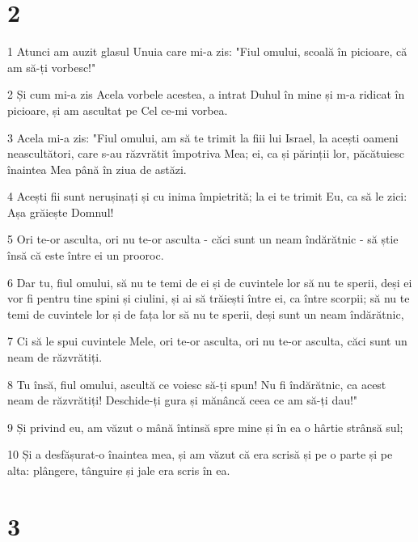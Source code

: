 \chapter{2}

\par 1 Atunci am auzit glasul Unuia care mi-a zis: "Fiul omului, scoală în picioare, că am să-ți vorbesc!"
\par 2 Și cum mi-a zis Acela vorbele acestea, a intrat Duhul în mine și m-a ridicat în picioare, și am ascultat pe Cel ce-mi vorbea.
\par 3 Acela mi-a zis: "Fiul omului, am să te trimit la fiii lui Israel, la acești oameni neascultători, care s-au răzvrătit împotriva Mea; ei, ca și părinții lor, păcătuiesc înaintea Mea până în ziua de astăzi.
\par 4 Acești fii sunt nerușinați și cu inima împietrită; la ei te trimit Eu, ca să le zici: Așa grăiește Domnul!
\par 5 Ori te-or asculta, ori nu te-or asculta - căci sunt un neam îndărătnic - să știe însă că este între ei un prooroc.
\par 6 Dar tu, fiul omului, să nu te temi de ei și de cuvintele lor să nu te sperii, deși ei vor fi pentru tine spini și ciulini, și ai să trăiești între ei, ca între scorpii; să nu te temi de cuvintele lor și de fața lor să nu te sperii, deși sunt un neam îndărătnic,
\par 7 Ci să le spui cuvintele Mele, ori te-or asculta, ori nu te-or asculta, căci sunt un neam de răzvrătiți.
\par 8 Tu însă, fiul omului, ascultă ce voiesc să-ți spun! Nu fi îndărătnic, ca acest neam de răzvrătiți! Deschide-ți gura și mănâncă ceea ce am să-ți dau!"
\par 9 Și privind eu, am văzut o mână întinsă spre mine și în ea o hârtie strânsă sul;
\par 10 Și a desfășurat-o înaintea mea, și am văzut că era scrisă și pe o parte și pe alta: plângere, tânguire și jale era scris în ea.

\chapter{3}

